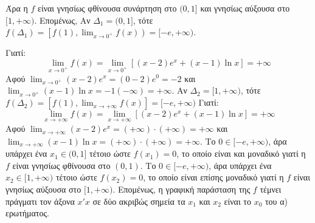 \begin{alist}
    Άρα η $f$ είναι γνησίως φθίνουσα συνάρτηση στο $(0,1]$ και γνησίως αύξουσα στο $[1,+\infty)$.
    Επομένως,
    Αν $\Delta_1 = (0,1]$, τότε $f(\Delta_1) = \left[f(1), \lim_{x \to 0^+} f(x)\right) = [-e,+\infty)$.

    Γιατί:
    \[ \lim_{x \to 0^+} f(x) = \lim_{x \to 0^+} \left[ (x-2)e^x + (x-1)\ln x \right] = +\infty \]
    Αφού $\lim_{x \to 0^+} (x-2)e^x = (0-2)e^0 = -2$ και $\lim_{x \to 0^+} (x-1)\ln x = -1(-\infty) = +\infty$.
    Αν $\Delta_2=[1,+\infty)$, τότε $f(\Delta_2) = [f(1), \lim_{x \to +\infty} f(x)] = [-e, +\infty)$
    Γιατί:
    \[ \lim_{x \to +\infty} f(x) = \lim_{x \to +\infty} \left[ (x-2)e^x + (x-1)\ln x \right] = +\infty \]
    Αφού $\lim_{x \to +\infty} (x-2)e^x = (+\infty) \cdot (+\infty) = +\infty$ και $\lim_{x \to +\infty} (x-1)\ln x = (+\infty) \cdot (+\infty) = +\infty$.
    Το $0 \in [-e, +\infty)$, άρα υπάρχει ένα $x_1 \in (0,1]$ τέτοιο ώστε $f(x_1) = 0$, το οποίο είναι και μοναδικό γιατί η $f$ είναι γνησίως φθίνουσα στο $(0,1)$.
    Το $0 \in [-e, +\infty)$, άρα υπάρχει ένα $x_2 \in [1,+\infty)$ τέτοιο ώστε $f(x_2) = 0$, το οποίο είναι επίσης μοναδικό γιατί η $f$ είναι γνησίως αύξουσα στο $[1,+\infty)$.
    Επομένως, η γραφική παράσταση της $f$ τέμνει πράγματι τον άξονα $x'x$ σε δύο ακριβώς σημεία τα $x_1$ και $x_2$ είναι το $x_0$ του α) ερωτήματος.
\end{alist}

\begin{center}
\end{center}